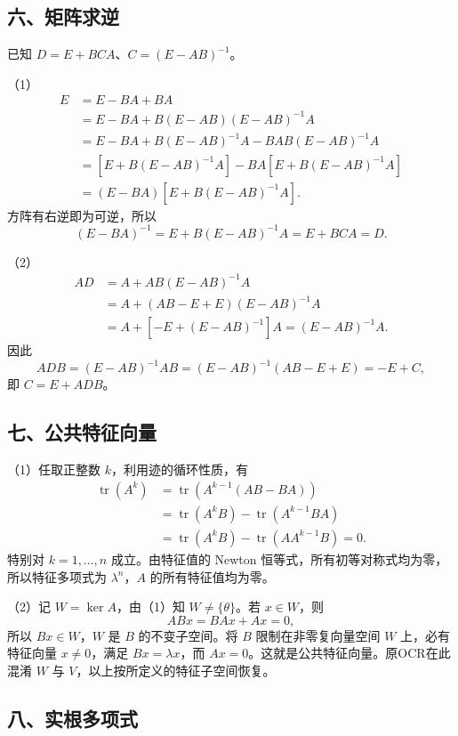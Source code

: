\documentclass[11pt,fontset=fandol]{ctexart}
\begin{document}
\subsection{六、矩阵求逆}\label{ux516dux77e9ux9635ux6c42ux9006}

已知 \(D=E+BCA\)、\(C=(E-AB)^{-1}\)。

（1） \[
\begin{aligned}
E&=E-BA+BA\\
&=E-BA+B(E-AB)(E-AB)^{-1}A\\
&=E-BA+B(E-AB)^{-1}A-BAB(E-AB)^{-1}A\\
&=[E+B(E-AB)^{-1}A]-BA[E+B(E-AB)^{-1}A]\\
&=(E-BA)[E+B(E-AB)^{-1}A].
\end{aligned}
\] 方阵有右逆即为可逆，所以 \[
(E-BA)^{-1}=E+B(E-AB)^{-1}A=E+BCA=D.
\]

（2） \[
\begin{aligned}
AD&=A+AB(E-AB)^{-1}A\\
&=A+(AB-E+E)(E-AB)^{-1}A\\
&=A+[-E+(E-AB)^{-1}]A=(E-AB)^{-1}A.
\end{aligned}
\] 因此 \[
ADB=(E-AB)^{-1}AB=(E-AB)^{-1}(AB-E+E)=-E+C,
\] 即 \(C=E+ADB\)。

\subsection{七、公共特征向量}\label{ux4e03ux516cux5171ux7279ux5f81ux5411ux91cf}

（1）任取正整数 \(k\)，利用迹的循环性质，有 \[
\begin{aligned}
\operatorname{tr}(A^k)
&=\operatorname{tr}(A^{k-1}(AB-BA))\\
&=\operatorname{tr}(A^kB)-\operatorname{tr}(A^{k-1}BA)\\
&=\operatorname{tr}(A^kB)-\operatorname{tr}(AA^{k-1}B)=0.
\end{aligned}
\] 特别对 \(k=1,\ldots,n\) 成立。由特征值的 Newton
恒等式，所有初等对称式均为零，所以特征多项式为 \(\lambda^n\)，\(A\)
的所有特征值均为零。

（2）记 \(W=\ker A\)，由（1）知 \(W\ne\{\theta\}\)。若 \(x\in W\)，则 \[
ABx=BAx+Ax=0,
\] 所以 \(Bx\in W\)，\(W\) 是 \(B\) 的不变子空间。将 \(B\)
限制在非零复向量空间 \(W\) 上，必有特征向量 \(x\ne0\)，满足
\(Bx=\lambda x\)，而 \(Ax=0\)。这就是公共特征向量。原OCR在此混淆 \(W\)
与 \(V\)，以上按所定义的特征子空间恢复。

\subsection{八、实根多项式}\label{ux516bux5b9eux6839ux591aux9879ux5f0f}
\end{document}
